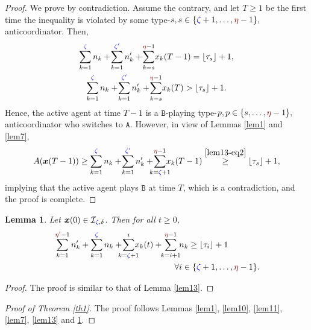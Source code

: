 \documentclass[10 pt,twocolumn,journal]{IEEEtran}
\DeclarePairedDelimiter{\floor}{\lfloor}{\rfloor}
\theoremstyle{plain}
\newtheorem{lemma}{Lemma}
\newcommand{\A}{\mathcal{A}}
\newcommand{\I}{\mathcal{I}}
\newcommand{\x}{\bm{x}}
\renewcommand{\r}{\tb{\zeta}}
\newcommand{\rr}{\tb{\zeta'}}
\newcommand{\s}{\tr{\eta}}
\renewcommand{\ss}{\tr{\eta'}}
\renewcommand{\d}{{\delta}}
\renewcommand{\A}{\mathtt{A}}
\newcommand{\B}{\mathtt{B}}
\newcommand{\tb}{\textcolor{blue}}
\newcommand{\tr}{\textcolor{Myred}}
\theoremstyle{definition}
\begin{document}
\begin{proof}
    We prove by contradiction. 
    Assume the contrary, and let $T\geq 1$ be the first time the inequality is violated by some type-$s,s\in\{\r+1,\ldots,\s-1\},$ anticoordinator.
    Then,
    \begin{gather} 
        \sum_{k=1}^{\r} n_k +\! \sum_{k=1}^{\rr} n'_k +\! \sum_{k=s}^{\s-1}\! x_k(T-1) = \floor{\tau_s}+1, \label{lem13-eq2} \\
        \sum_{k=1}^{\r} n_k +\! \sum_{k=1}^{\rr} n'_k +\! \sum_{k=s}^{\s-1}\! x_k(T) > \floor{\tau_s}+1. \nonumber
    \end{gather}
    Hence, the active agent at time $T-1$ is a $\B$-playing type-$p,p\in\{s,\ldots,\s-1\},$ anticoordinator who switches to $\A$. 
    However, in view of Lemmas \ref{lem1} and \ref{lem7}, 
    \begin{equation*}
        A(\x(T-1)) 
        \geq \sum_{k=1}^{\r} n_k +\! \sum_{k=1}^{\rr} n'_k 
        +\!\!\!\! \sum_{k=\r+1}^{\s-1}\!\!\!\! x_k(T-1)
        \overset{\eqref{lem13-eq2}}{\geq}
        \floor{\tau_s}+1,
    \end{equation*}
    implying that the active agent plays $\B$ at time $T$, which is a contradiction, and the proof is complete.
\end{proof}
%
\begin{lemma} \label{lem14}
    Let $\x(0) \in \I_{\r,\d}$. 
    Then for all $t\geq 0$,
    \begin{align*}
        &\sum_{k=1}^{\ss-1} n'_k+\sum_{k=1}^{\r} n_k  +\!\!\!\! \sum_{k=\r+1}^{i}\!\!\!\! x_k(t) 
        + \!\!\sum_{k=i+1}^{\s-1}\!\! n_k 
        \geq \floor{\tau_i}+1\\
         &\qquad\qquad\qquad\qquad\qquad\qquad\qquad\   \forall i\in\{\r+1,\ldots,\s-1\}.
    \end{align*}
\end{lemma}
\begin{proof}
    The proof is similar to that of Lemma \ref{lem13}.
\end{proof}
%
\begin{proof}[Proof of Theorem \ref{th1}]
    The proof follows Lemmas \ref{lem1}, \ref{lem10}, \ref{lem11}, \ref{lem7}, \ref{lem13} and \ref{lem14}.
\end{proof}
%
\end{document}
